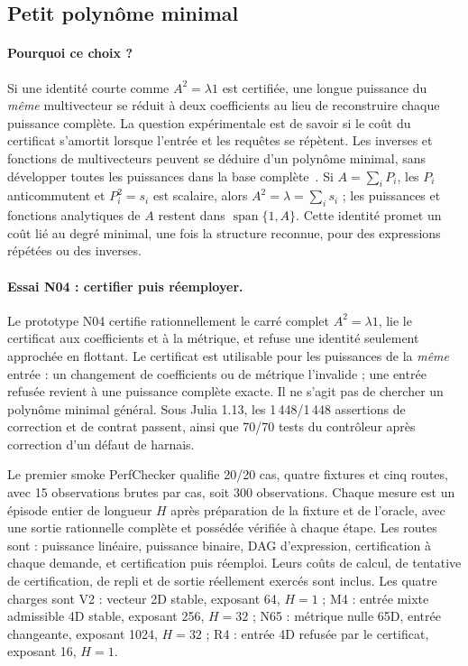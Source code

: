 \documentclass[11pt,a4paper]{article}
\begin{document}
\FloatBarrier
\subsection{Petit polynôme minimal}
\paragraph{Pourquoi ce choix ?}
Si une identité courte comme $A^2=\lambda 1$ est certifiée, une longue
puissance du \emph{même} multivecteur se réduit à deux coefficients
au lieu de reconstruire chaque puissance complète. La question
expérimentale est de savoir si le coût du certificat s'amortit lorsque
l'entrée et les requêtes se répètent.
Les inverses et fonctions de multivecteurs peuvent se déduire d'un
polynôme minimal, sans développer toutes les puissances dans la base
complète~\cite{prodanov}. Si $A=\sum_i P_i$, les $P_i$ anticommutent et
$P_i^2=s_i$ est scalaire, alors $A^2=\lambda=\sum_i s_i$ ; les puissances
et fonctions analytiques de $A$ restent dans $\operatorname{span}\{1,A\}$.
Cette identité promet un coût lié au degré minimal, une fois la structure
reconnue, pour des expressions répétées ou des inverses.

\paragraph{Essai N04 : certifier puis réemployer.}
Le prototype N04 certifie rationnellement le carré complet
$A^2=\lambda 1$, lie le certificat aux coefficients et à la métrique,
et refuse une identité seulement approchée en flottant.
Le certificat est utilisable pour les puissances de la \emph{même} entrée :
un changement de coefficients ou de métrique l'invalide ; une entrée
refusée revient à une puissance complète exacte. Il ne s'agit pas de
chercher un polynôme minimal général. Sous Julia 1.13, les 1\,448/1\,448
assertions de correction et de contrat passent, ainsi que 70/70 tests du
contrôleur après correction d'un défaut de harnais.

Le premier smoke PerfChecker qualifie 20/20 cas, quatre fixtures et cinq
routes, avec 15 observations brutes par cas, soit 300 observations.
Chaque mesure est un épisode entier de longueur $H$ après préparation de
la fixture et de l'oracle, avec une sortie rationnelle complète et
possédée vérifiée à chaque étape. Les routes sont : puissance linéaire,
puissance binaire, DAG d'expression, certification à chaque demande,
et certification puis réemploi. Leurs coûts de calcul, de tentative de
certification, de repli et de sortie réellement exercés sont inclus.
Les quatre charges sont V2 : vecteur 2D stable, exposant 64, $H=1$ ;
M4 : entrée mixte admissible 4D stable, exposant 256, $H=32$ ;
N65 : métrique nulle 65D, entrée changeante, exposant 1024, $H=32$ ;
R4 : entrée 4D refusée par le certificat, exposant 16, $H=1$.
\end{document}
